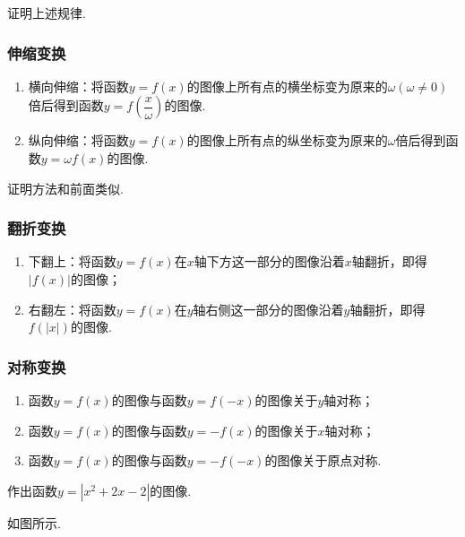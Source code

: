 \documentclass[lang=cn,math=cm,chinesefont=nofont,11pt,scheme=chinese,twocol]{elegantbook}
\begin{document}
\begin{exercise}
  证明上述规律.
\end{exercise}

\subsubsection{伸缩变换}

\begin{enumerate}
  \item 横向伸缩：将函数$y=f(x)$的图像上所有点的横坐标变为原来的$\omega(\omega\neq 0)$倍后得到函数$y=f(\dfrac{x}{\omega})$的图像.
  \item 纵向伸缩：将函数$y=f(x)$的图像上所有点的纵坐标变为原来的$\omega$倍后得到函数$y=\omega f(x)$的图像.
\end{enumerate}

证明方法和前面类似.

\subsubsection{翻折变换}

\begin{enumerate}
  \item 下翻上：将函数$y=f(x)$在$x$轴下方这一部分的图像沿着$x$轴翻折，即得$\left| f(x)\right|$的图像；
  \item 右翻左：将函数$y=f(x)$在$y$轴右侧这一部分的图像沿着$y$轴翻折，即得$f(\left| x\right|)$的图像.
\end{enumerate}

\subsubsection{对称变换}

\begin{enumerate}
  \item 函数$y=f(x)$的图像与函数$y=f(-x)$的图像关于$y$轴对称；
  \item 函数$y=f(x)$的图像与函数$y=-f(x)$的图像关于$x$轴对称；
  \item 函数$y=f(x)$的图像与函数$y=-f(-x)$的图像关于原点对称.
\end{enumerate}

\begin{example}
  作出函数$y=\left| x^2+2x-2\right|$的图像.
\end{example}

\begin{solution}
  如图所示.
\end{solution}
\end{document}
